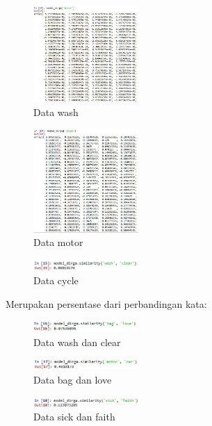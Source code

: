 \hfill\break
\begin{figure}[H]
\includegraphics[width=4cm]{figures/1174067/5/hasil1-10.jpg}
\centering
\caption{Data wash}
\end{figure}

\hfill\break
\begin{figure}[H]
\includegraphics[width=4cm]{figures/1174067/5/hasil1-11.jpg}
\centering
\caption{Data motor}
\end{figure}

\hfill\break
\begin{figure}[H]
\includegraphics[width=4cm]{figures/1174067/5/hasil1-12.jpg}
\centering
\caption{Data cycle}
\end{figure}


Merupakan persentase dari perbandingan kata:
\hfill\break
\begin{figure}[H]
\includegraphics[width=4cm]{figures/1174067/5/hasil1-13.jpg}
\centering
\caption{Data wash dan clear}
\end{figure}

\hfill\break
\begin{figure}[H]
\includegraphics[width=4cm]{figures/1174067/5/hasil1-14.jpg}
\centering
\caption{Data bag dan love}
\end{figure}

\hfill\break
\begin{figure}[H]
\includegraphics[width=4cm]{figures/1174067/5/hasil1-15.jpg}
\centering
\caption{Data sick dan faith}
\end{figure}

